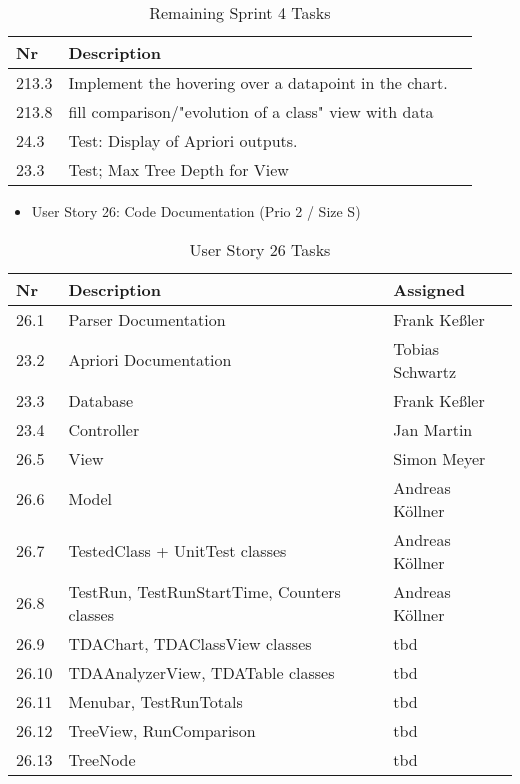 \begin{table}[h]
  \caption{Remaining Sprint 4 Tasks}
  \label{Remaing Tasks}
  \centering
  \begin{tabular}{p{1cm}|p{5cm}|p{3cm}|}
  	Nr & Description  \\ 
  	\hline
  	213.3 & Implement the hovering over a datapoint in the chart. \\ 
  	\hline
  	213.8 & fill comparison/"evolution of a class" view with data \\ 
  	\hline
  	24.3 & Test: Display of Apriori outputs. \\ 
  	\hline
  	23.3 & Test; Max Tree Depth for View \\ 
  	\hline
  \end{tabular}
\end{table}
\begin{itemize}
	\item User Story 26: Code Documentation (Prio 2 / Size S)
	\end{itemize}
\begin{table}[h]
  \caption{User Story 26 Tasks}
  \label{Story 26 Tasks}
  \centering
  \begin{tabular}{p{1cm}|p{5cm}|p{3cm}|}
  	Nr & Description & Assigned \\ 
  	\hline
  	26.1 & Parser Documentation & Frank Keßler \\ 
  	\hline
  	23.2 & Apriori Documentation & Tobias Schwartz \\ 
  	\hline
  	23.3 & Database & Frank Keßler \\ 
  	\hline
  	23.4 & Controller &  Jan Martin \\ 
  	\hline
  	26.5 & View & Simon Meyer \\ 
  	\hline
  	26.6 & Model & Andreas Köllner \\ 
  	\hline
  	26.7 & TestedClass + UnitTest classes & Andreas Köllner \\ 
  	\hline
  	26.8 & TestRun, TestRunStartTime, Counters classes & Andreas Köllner \\ 
  	\hline
  	26.9 & TDAChart, TDAClassView classes & tbd \\ 
  	\hline
  	26.10 & TDAAnalyzerView, TDATable classes & tbd \\ 
  	\hline
  	26.11 & Menubar, TestRunTotals & tbd \\ 
  	\hline
  	26.12 & TreeView, RunComparison & tbd \\ 
  	\hline
  	26.13 & TreeNode & tbd \\ 
  	\hline
  \end{tabular}
\end{table}

